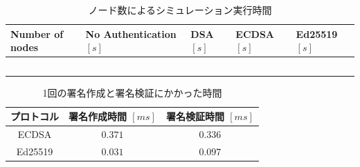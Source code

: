 \begin{longtable}{
    >{\raggedright\arraybackslash}p{3cm}
    >{\raggedright\arraybackslash}p{3.7cm}
    >{\raggedright\arraybackslash}p{2.5cm}
    >{\raggedright\arraybackslash}p{2.5cm}
    >{\raggedright\arraybackslash}p{2.5cm}
  }
  \caption{ノード数によるシミュレーション実行時間}
  \label{tab:exp3_simtime} \\
  \endfirsthead
  \hline
  Number of nodes & No Authentication $[s]$ & DSA $[s]$ & ECDSA $[s]$ & Ed25519 $[s]$ \\ \hline \hline
  \multicolumn{1}{c}{$37$} &
  \multicolumn{1}{c}{$14.1802$} &
  \multicolumn{1}{l}{$69.9882$} &
  \multicolumn{1}{l}{$55.0108$} &
  \multicolumn{1}{l}{$24.4069$} \\
  \multicolumn{1}{c}{$74$} &
  \multicolumn{1}{c}{$50.5984$} &
  \multicolumn{1}{l}{$267.433$} &
  \multicolumn{1}{l}{$194.408$} &
  \multicolumn{1}{l}{$89.2728$} \\
  \multicolumn{1}{c}{$112$} &
  \multicolumn{1}{c}{$110.405$} &
  \multicolumn{1}{l}{$625.504$} &
  \multicolumn{1}{l}{$436.926$} &
  \multicolumn{1}{l}{$200.901$} \\
  \multicolumn{1}{c}{$148$} &
  \multicolumn{1}{c}{$196.971$} &
  \multicolumn{1}{l}{$1172.57$} &
  \multicolumn{1}{l}{$910.373$} &
  \multicolumn{1}{l}{$431.346$} \\
  \multicolumn{1}{c}{$185$} &
  \multicolumn{1}{c}{$345.059$} &
  \multicolumn{1}{l}{$1908.7$} &
  \multicolumn{1}{l}{$1324.55$} &
  \multicolumn{1}{l}{$635.155$} \\ \hline

\end{longtable}

\begin{longtable}{c|cc}
  \caption{1回の署名作成と署名検証にかかった時間}
  \label{tab:exp3_sigtime} \\
  \endfirsthead
  \hline
  プロトコル & 署名作成時間 $[ms]$ & 署名検証時間 $[ms]$ \\ \hline
  ECDSA & $0.371$ & $0.336$ \\
  Ed25519 & $0.031$ & $0.097$ \\ \hline
\end{longtable}

